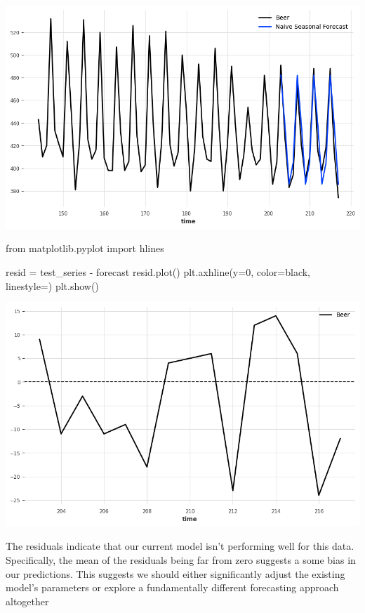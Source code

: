 \documentclass[
  11pt,
]{article}
\newenvironment{Shaded}{\begin{snugshade}}{\end{snugshade}}
\newcommand{\DecValTok}[1]{\textcolor[rgb]{0.68,0.00,0.00}{#1}}
\newcommand{\ImportTok}[1]{\textcolor[rgb]{0.00,0.46,0.62}{#1}}
\newcommand{\NormalTok}[1]{\textcolor[rgb]{0.00,0.23,0.31}{#1}}
\newcommand{\OperatorTok}[1]{\textcolor[rgb]{0.37,0.37,0.37}{#1}}
\newcommand{\StringTok}[1]{\textcolor[rgb]{0.13,0.47,0.30}{#1}}
\begin{document}
\includegraphics{hw3_files/figure-pdf/cell-36-output-1.png}

\begin{Shaded}
\begin{Highlighting}[]
\ImportTok{from}\NormalTok{ matplotlib.pyplot }\ImportTok{import}\NormalTok{ hlines}


\NormalTok{resid }\OperatorTok{=}\NormalTok{ test\_series }\OperatorTok{{-}}\NormalTok{ forecast}
\NormalTok{resid.plot()}
\NormalTok{plt.axhline(y}\OperatorTok{=}\DecValTok{0}\NormalTok{, color}\OperatorTok{=}\StringTok{\textquotesingle{}black\textquotesingle{}}\NormalTok{, linestyle}\OperatorTok{=}\StringTok{\textquotesingle{}{-}{-}\textquotesingle{}}\NormalTok{)}
\NormalTok{plt.show()}
\end{Highlighting}
\end{Shaded}

\includegraphics{hw3_files/figure-pdf/cell-37-output-1.png}

The residuals indicate that our current model isn't performing well for
this data. Specifically, the mean of the residuals being far from zero
suggests a some bias in our predictions. This suggests we should either
significantly adjust the existing model's parameters or explore a
fundamentally different forecasting approach altogether
\end{document}
